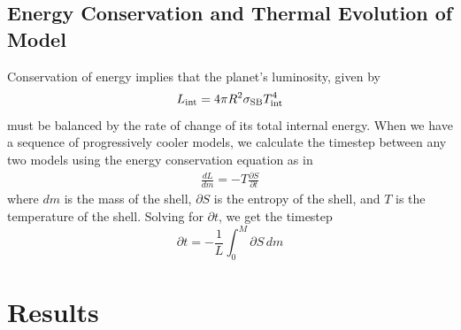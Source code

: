 \documentclass[11pt]{ucscthesisbs}
\begin{document}
\section{Energy Conservation and Thermal Evolution of Model}
Conservation of energy implies that the planet's luminosity, given by
\begin{equation}
L_{\rm int} = 4\pi R^2\sigma_{\rm SB}T_{\rm int}^4
\label{eq:intrinsic_luminosity}
\end{equation}
must be balanced by the rate of change of its total internal energy. When we have a sequence of progressively cooler models, we calculate the timestep between any two models using the energy conservation equation as in \citep{fortney_2011}
\begin{align}
\frac{dL}{dm}= -T\frac{\partial S}{\partial t}
\label{eq:energy_conservation}
\end{align}
where $dm$ is the mass of the shell, $\partial S$ is the entropy of the shell, and $T$ is the temperature of the shell. Solving for $\partial t$, we get the timestep
\begin{equation}
\partial t = -\frac{1}{L} \int_{0}^{M} \partial S \,dm
\label{eq:timestep}
\end{equation}

\chapter{Results}
\end{document}
